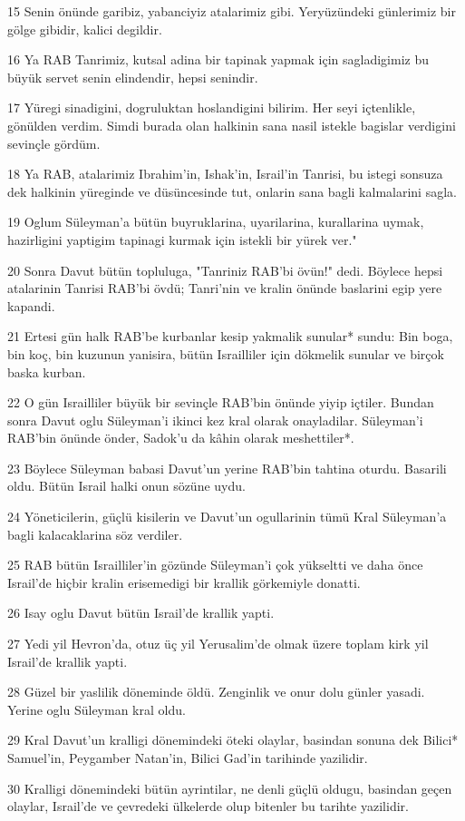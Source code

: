 \par 15 Senin önünde garibiz, yabanciyiz atalarimiz gibi. Yeryüzündeki günlerimiz bir gölge gibidir, kalici degildir.
\par 16 Ya RAB Tanrimiz, kutsal adina bir tapinak yapmak için sagladigimiz bu büyük servet senin elindendir, hepsi senindir.
\par 17 Yüregi sinadigini, dogruluktan hoslandigini bilirim. Her seyi içtenlikle, gönülden verdim. Simdi burada olan halkinin sana nasil istekle bagislar verdigini sevinçle gördüm.
\par 18 Ya RAB, atalarimiz Ibrahim'in, Ishak'in, Israil'in Tanrisi, bu istegi sonsuza dek halkinin yüreginde ve düsüncesinde tut, onlarin sana bagli kalmalarini sagla.
\par 19 Oglum Süleyman'a bütün buyruklarina, uyarilarina, kurallarina uymak, hazirligini yaptigim tapinagi kurmak için istekli bir yürek ver."
\par 20 Sonra Davut bütün topluluga, "Tanriniz RAB'bi övün!" dedi. Böylece hepsi atalarinin Tanrisi RAB'bi övdü; Tanri'nin ve kralin önünde baslarini egip yere kapandi.
\par 21 Ertesi gün halk RAB'be kurbanlar kesip yakmalik sunular* sundu: Bin boga, bin koç, bin kuzunun yanisira, bütün Israilliler için dökmelik sunular ve birçok baska kurban.
\par 22 O gün Israilliler büyük bir sevinçle RAB'bin önünde yiyip içtiler. Bundan sonra Davut oglu Süleyman'i ikinci kez kral olarak onayladilar. Süleyman'i RAB'bin önünde önder, Sadok'u da kâhin olarak meshettiler*.
\par 23 Böylece Süleyman babasi Davut'un yerine RAB'bin tahtina oturdu. Basarili oldu. Bütün Israil halki onun sözüne uydu.
\par 24 Yöneticilerin, güçlü kisilerin ve Davut'un ogullarinin tümü Kral Süleyman'a bagli kalacaklarina söz verdiler.
\par 25 RAB bütün Israilliler'in gözünde Süleyman'i çok yükseltti ve daha önce Israil'de hiçbir kralin erisemedigi bir krallik görkemiyle donatti.
\par 26 Isay oglu Davut bütün Israil'de krallik yapti.
\par 27 Yedi yil Hevron'da, otuz üç yil Yerusalim'de olmak üzere toplam kirk yil Israil'de krallik yapti.
\par 28 Güzel bir yaslilik döneminde öldü. Zenginlik ve onur dolu günler yasadi. Yerine oglu Süleyman kral oldu.
\par 29 Kral Davut'un kralligi dönemindeki öteki olaylar, basindan sonuna dek Bilici* Samuel'in, Peygamber Natan'in, Bilici Gad'in tarihinde yazilidir.
\par 30 Kralligi dönemindeki bütün ayrintilar, ne denli güçlü oldugu, basindan geçen olaylar, Israil'de ve çevredeki ülkelerde olup bitenler bu tarihte yazilidir.


